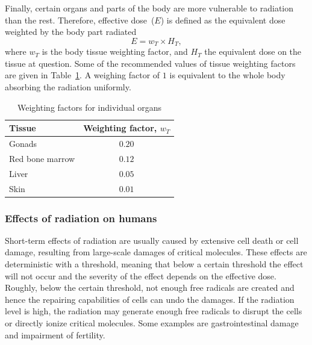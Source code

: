 \documentclass[nofootinbib,preprint,aps]{revtex4-1}
\begin{document}
        Finally, certain organs and parts of the body are more vulnerable to radiation than the rest.
        Therefore, effective dose~($E$) is defined as the equivalent dose weighted by the body part
        radiated
        \begin{equation}
            E = w_T \times H_T,
        \end{equation}
        where $w_T$ is the body tissue weighting factor, and $H_T$ the equivalent dose on the tissue
        at question.
        Some of the recommended values of tissue
        weighting factors are given in Table~\ref{tab:eff}. A weighing factor of $1$ is equivalent to the
        whole body absorbing the radiation uniformly.
        \begin{table}[h]
            \centering
            \caption{Weighting factors for individual organs \cite{icrp74}}
            \begin{ruledtabular}
                \begin{tabular}{l c}
                Tissue & Weighting factor, $w_T$\\
                \hline
                Gonads & $0.20$\\
                Red bone marrow & $0.12$ \\
                Liver & $0.05$ \\
                Skin & $0.01$ \\
                \end{tabular}
                \label{tab:eff}
            \end{ruledtabular}
        \end{table}

        \subsubsection{Effects of radiation on humans}
        Short-term effects of radiation are usually caused by extensive cell death or cell damage, resulting
        from large-scale damages of critical molecules.\cite{u16}
        These effects are deterministic with a threshold,
        meaning that below a certain threshold the effect will not occur and
        the severity of the effect depends on the effective dose. Roughly, below the certain threshold,
        not enough free radicals are created and hence the repairing capabilities of cells can undo the damages.
        If the radiation level is high, the radiation may generate enough free radicals to disrupt the cells or directly
        ionize critical molecules. Some examples are gastrointestinal damage and impairment
        of fertility.\cite{u16}
\end{document}
